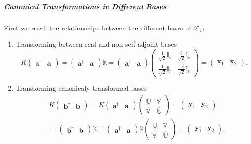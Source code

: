 \documentclass[aps, preprint]{revtex4}
\begin{document}
\subparagraph{Canonical Transformations in Different Bases}
First we recall the relationships between the different bases of $\mathcal{F}_{1}$: 


\begin{enumerate}
\item Transforming between real and non self adjoint bases
\begin{equation}K \left (\begin{array}{cc}\mathbf{a}^{ \dag } & \mathbf{a}\end{array}\right ) =\left (\begin{array}{cc}\mathbf{a}^{ \dag } & \mathbf{a}\end{array}\right ) \mathbb{K} =\left (\begin{array}{cc}\mathbf{a}^{ \dag } & \mathbf{a}\end{array}\right ) \left (\begin{array}{cc}\frac{1}{\sqrt{2}} \mathbb{I}_{r} & \frac{i}{\sqrt{2}} \mathbb{I}_{r} \\
\frac{1}{\sqrt{2}} \mathbb{I}_{r} & \frac{ -i}{\sqrt{2}} \mathbb{I}_{r}\end{array}\right ) =\left (\begin{array}{cc}\mathbf{x}_{1} & \mathbf{x}_{2}\end{array}\right )\text{.}
\end{equation}

\item Transforming canonicaly transformed bases
\begin{align*} & K \left (\begin{array}{cc}\mathbf{b}^{ \dag } & \mathbf{b}\end{array}\right ) =K \left (\begin{array}{cc}\mathbf{a}^{ \dag } & \mathbf{a}\end{array}\right ) \left (\begin{array}{cc}\mathbb{U} & \overline{\mathbb{V}} \\
\mathbb{V} & \overline{\mathbb{U}}\end{array}\right ) =\left (\begin{array}{cc}\mathbf{y}_{1} & \mathbf{y}_{2}\end{array}\right ) \\
 &  =\left (\begin{array}{cc}\mathbf{b}^{ \dag } & \mathbf{b}\end{array}\right ) \mathbb{K} =\left (\begin{array}{cc}\mathbf{a}^{ \dag } & \mathbf{a}\end{array}\right ) \mathbb{K} \left (\begin{array}{cc}\mathbb{U} & \overline{\mathbb{V}} \\
\mathbb{V} & \overline{\mathbb{U}}\end{array}\right ) =\left (\begin{array}{cc}\mathbf{y}_{1} & \mathbf{y}_{2}\end{array}\right )\text{.}\end{align*}


\end{enumerate}
\end{document}
